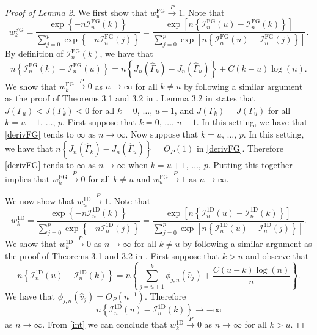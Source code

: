 \documentclass{article}\usepackage[]{graphicx}\usepackage[]{color}
\newcommand{\Gamhat}{\widehat{\Gamma}}
\newcommand{\IoneD}{\mathcal{I}_n^{\text{1D}}}
\newcommand{\IFG}{\mathcal{I}_n^{\text{FG}}}
\newcommand{\wFG}{w^{\text{FG}}}
\newcommand{\woneD}{w^{\text{1D}}}
\begin{document}
\begin{proof}[Proof of Lemma 2]
We first show that $w_u^{\text{FG}} \overset{P}{\to} 1$. Note that 
$$
  \wFG_k = \frac
  {
    \exp\left\{-n\IFG(k)\right\}
  }
  {
    \sum_{j=0}^p\exp\left\{-n\IFG(j)\right\}
  }
  = \frac
  {
    \exp\left[n\left\{\IFG(u) - \IFG(k)\right\}\right]
  }
  {
    \sum_{j=0}^p\exp\left[n\left\{\IFG(u) - \IFG(j)\right\}\right]
  }.
$$
By definition of $\IFG(k)$, we have that 
\begin{equation}
  n\left\{\IFG(k) - \IFG(u)\right\} 
    = n\left\{J_n(\Gamhat_k) - J_n(\Gamhat_u)\right\} + C(k-u)\log(n).  
\label{derivFG}
\end{equation}
We show that $\wFG_k \overset{P}{\to} 0$ as $n \to \infty$ for all $k \neq u$ by following 
a similar argument as the proof of Theorems 3.1 and 3.2 in \cite{zhangmai}.  
Lemma 3.2 in \citet{zhangmai} states that $J(\Gamma_u) < J(\Gamma_k) < 0$ for 
all $k = 0$, $\ldots$, $u-1$, and $J(\Gamma_k) = J(\Gamma_u)$ for all 
$k = u+1$, $\ldots$, $p$.  First suppose that $k = 0$, $\ldots$, $u-1$.  
In this setting, we have that \eqref{derivFG} tends to $\infty$ 
as $n \to \infty$.  Now suppose that $k = u$, $\ldots$, $p$.  In this setting, 
we have that 
$
  n\left\{J_n(\Gamhat_k) - J_n(\Gamhat_u)\right\} = O_P(1)
$ 
in \eqref{derivFG}.  Therefore \eqref{derivFG} tends to $\infty$ as 
$n \to \infty$ when $k = u+1$, $\ldots$, $p$. %
Putting this together implies that $\wFG_k \overset{P}{\to} 0$ for all $k \neq u$ 
and $\wFG_u \overset{P}{\to} 1$ as $n \to \infty$.   

We now show that $w_u^{\text{1D}} \overset{P}{\to} 1$. Note that 
\begin{equation}
  \woneD_k = \frac
  {
    \exp\left\{-n\IoneD(k)\right\}
  }
  {
    \sum_{j=0}^p\exp\left\{-n\IoneD(j)\right\}
  }
  = \frac
  {
    \exp\left[n\left\{\IoneD(u) - \IoneD(k)\right\}\right]
  }
  {
    \sum_{j=0}^p\exp\left[n\left\{\IoneD(u) - \IoneD(j)\right\}\right]
  }.
\label{int}
\end{equation}
We show that $\woneD_k \overset{P}{\to} 0$ as $n \to \infty$ for all $k \neq u$ by following a similar argument as the proof of Theorems 3.1 and 3.2 in \cite{zhangmai}.  First suppose that $k > u$ and observe that 
$$
  n\left\{\IoneD(u) - \IoneD(k)\right\} 
    = n\left\{\sum_{j=u+1}^k \phi_{j,n}(\hat{v}_j) 
      + \frac{C(u-k)\log(n)}{n}\right\}.
$$
We have that $\phi_{j,n}(\hat{v}_j) = O_P\left(n^{-1}\right)$. Therefore 
$$
  n\left\{\IoneD(u) - \IoneD(k)\right\} \to -\infty
$$ 
as $n \to \infty$.  
From \eqref{int} we can conclude that $\woneD_k \overset{P}{\to} 0$ as $n \to \infty$ for all $k > u$. 


\end{proof}
\end{document}
